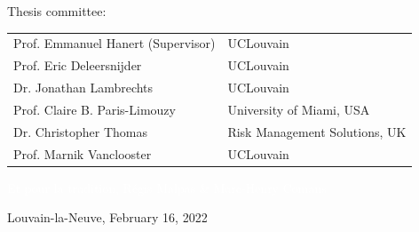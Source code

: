 \vspace*{0.5cm}
\begin{minipage}{\textwidth}
\begin{center}

\large Thesis committee:\\

\vspace*{0.5cm}
\footnotesize{
\hspace{-1cm}
\begin{tabular}{ll}
Prof. Emmanuel Hanert (Supervisor) & UCLouvain \\
Prof. Eric Deleersnijder           & UCLouvain\\
Dr. Jonathan Lambrechts            & UCLouvain \\
Prof. Claire B. Paris-Limouzy      & University of Miami, USA \\
Dr. Christopher Thomas             & Risk Management Solutions, UK \\
Prof. Marnik Vanclooster           & UCLouvain
\end{tabular}
}

\textcolor{white}{Et pour la tradition, Régis Malpas \& Marc-Henry Comans}

\end{center}
\end{minipage}

\vspace*{.5cm}
\begin{minipage}{\textwidth}
\centering
\large Louvain-la-Neuve, February 16, 2022
\end{minipage}
